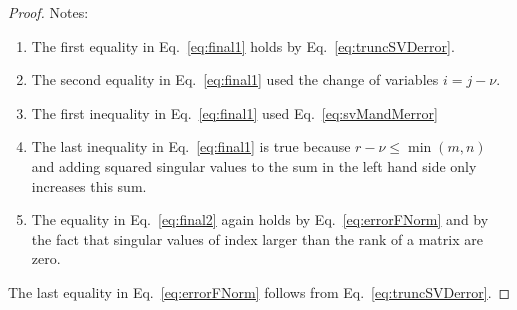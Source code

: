 \documentclass[12pt]{article}
\begin{document}
\begin{appendices}
\begin{proof}
        Notes:
        \begin{enumerate}
            \item The first equality in Eq.~\ref{eq:final1} holds by
                Eq.~\ref{eq:truncSVDerror}.
            \item The second equality in Eq.~\ref{eq:final1} used the change of
                variables $i=j-\nu$.
            \item The first inequality in Eq.~\ref{eq:final1} used
                Eq.~\ref{eq:svMandMerror}
            \item The last inequality in Eq.~\ref{eq:final1} is true because
                $r-\nu\leq\min(m,n)$ and adding squared singular values to the sum in
                the left hand side only increases this sum.
            \item The equality in Eq.~\ref{eq:final2} again holds by
                Eq.~\ref{eq:errorFNorm} and by the fact that singular values of
                index larger than the rank of a matrix are zero.
        \end{enumerate}

        The last equality in Eq.~\ref{eq:errorFNorm} follows from
        Eq.~\ref{eq:truncSVDerror}.

    \end{proof}

\end{appendices}
\end{document}
